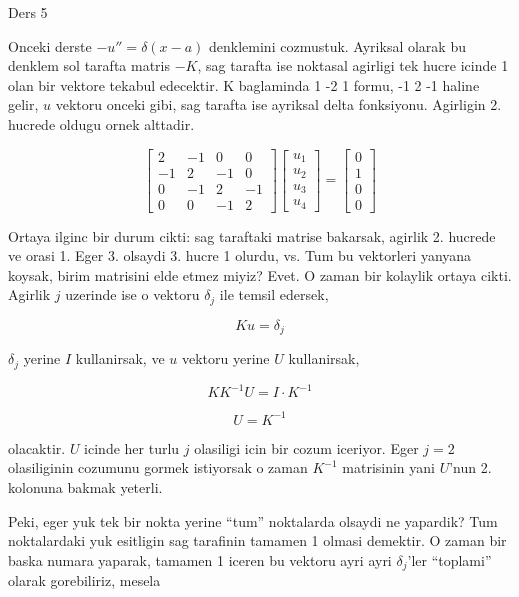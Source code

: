 \documentclass[12pt,fleqn]{article}
\begin{document}
Ders 5

Onceki derste $-u'' = \delta(x-a)$ denklemini cozmustuk. Ayriksal olarak bu
denklem sol tarafta matris $-K$, sag tarafta ise noktasal agirligi tek
hucre icinde 1 olan bir vektore tekabul edecektir. K baglaminda 1 -2 1
formu, -1 2 -1 haline gelir, $u$ vektoru onceki gibi, sag tarafta ise
ayriksal delta fonksiyonu. Agirligin 2. hucrede oldugu ornek alttadir. 

\[  
\left[\begin{array}{cccc}
2 & -1 & 0 & 0 \\
-1 & 2 & -1 & 0 \\
0 & -1 & 2 & -1 \\
0 & 0 & -1 & 2 
\end{array}\right]
\left[\begin{array}{c}
u_1 \\
u_2 \\
u_3 \\
u_4
\end{array}\right]
=
\left[\begin{array}{c}
0 \\
1 \\
0 \\
0
\end{array}\right]
\]

Ortaya ilginc bir durum cikti: sag taraftaki matrise bakarsak, agirlik
2. hucrede ve orasi 1. Eger 3. olsaydi 3. hucre 1 olurdu, vs. Tum bu
vektorleri yanyana koysak, birim matrisini elde etmez miyiz? Evet. O zaman
bir kolaylik ortaya cikti. Agirlik $j$ uzerinde ise o vektoru $\delta_j$
ile temsil edersek, 

\[ Ku = \delta_j \]

$\delta_j$ yerine $I$ kullanirsak, ve $u$ vektoru yerine $U$ kullanirsak,

\[ KK^{-1}U = I \cdot K^{-1}\]

\[ U = K^{-1} \]

olacaktir. $U$ icinde her turlu $j$ olasiligi icin bir cozum iceriyor. Eger
$j=2$ olasiliginin cozumunu gormek istiyorsak o zaman $K^{-1}$ matrisinin
yani $U$'nun 2. kolonuna bakmak yeterli.

Peki, eger yuk tek bir nokta yerine ``tum'' noktalarda olsaydi ne yapardik?
Tum noktalardaki yuk esitligin sag tarafinin tamamen 1 olmasi demektir. O
zaman bir baska numara yaparak, tamamen 1 iceren bu vektoru ayri ayri
$\delta_j$'ler ``toplami'' olarak gorebiliriz, mesela
\end{document}
